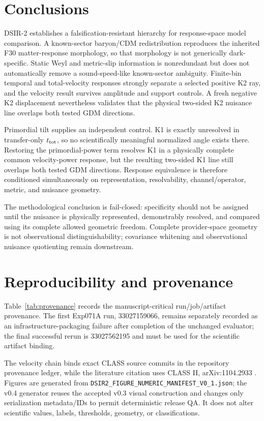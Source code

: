 \documentclass[11pt]{article}
\newcommand{\ttot}{t_{\rm tot}}
\begin{document}
\section{Conclusions}
DSIR-2 establishes a falsification-resistant hierarchy for response-space model comparison. A known-sector baryon/CDM redistribution reproduces the inherited F30 matter-response morphology, so that morphology is not generically dark-specific. Static Weyl and metric-slip information is nonredundant but does not automatically remove a sound-speed-like known-sector ambiguity. Finite-bin temporal and total-velocity responses strongly separate a selected positive K2 ray, and the velocity result survives amplitude and support controls. A fresh negative K2 displacement nevertheless validates that the physical two-sided K2 nuisance line overlaps both tested GDM directions.

Primordial tilt supplies an independent control. K1 is exactly unresolved in transfer-only $\ttot$, so no scientifically meaningful normalized angle exists there. Restoring the primordial-power term resolves K1 in a physically complete common velocity-power response, but the resulting two-sided K1 line still overlaps both tested GDM directions. Response equivalence is therefore conditioned simultaneously on representation, resolvability, channel/operator, metric, and nuisance geometry.

The methodological conclusion is fail-closed: specificity should not be assigned until the nuisance is physically represented, demonstrably resolved, and compared using its complete allowed geometric freedom. Complete provider-space geometry is not observational distinguishability; covariance whitening and observational nuisance quotienting remain downstream.

\section{Reproducibility and provenance}
Table~\ref{tab:provenance} records the manuscript-critical run/job/artifact provenance. The first Exp071A run, 33027159066, remains separately recorded as an infrastructure-packaging failure after completion of the unchanged evaluator; the final successful rerun is 33027562195 and must be used for the scientific artifact binding.

The velocity chain binds exact CLASS source commits in the repository provenance ledger, while the literature citation uses CLASS II, arXiv:1104.2933 \citep{BlasLesgourguesTram2011CLASSII}. Figures are generated from \texttt{DSIR2\_FIGURE\_NUMERIC\_MANIFEST\_V0\_1.json}; the v0.4 generator reuses the accepted v0.3 visual construction and changes only serialization metadata/IDs to permit deterministic release QA. It does not alter scientific values, labels, thresholds, geometry, or classifications.
\end{document}

